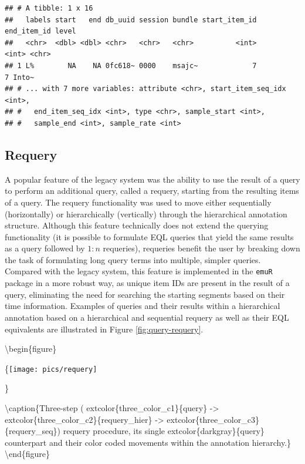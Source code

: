 \documentclass[]{book}
\begin{document}
\begin{verbatim}
## # A tibble: 1 x 16
##   labels start   end db_uuid session bundle start_item_id end_item_id level
##   <chr>  <dbl> <dbl> <chr>   <chr>   <chr>          <int>       <int> <chr>
## 1 L%        NA    NA 0fc618~ 0000    msajc~             7           7 Into~
## # ... with 7 more variables: attribute <chr>, start_item_seq_idx <int>,
## #   end_item_seq_idx <int>, type <chr>, sample_start <int>,
## #   sample_end <int>, sample_rate <int>
\end{verbatim}

\hypertarget{subsec:requery}{%
\subsection{Requery}\label{subsec:requery}}

A popular feature of the legacy system was the ability to use the result of a query to perform an additional query, called a requery, starting from the resulting items of a query. The requery functionality was used to move either sequentially (horizontally) or hierarchically (vertically) through the hierarchical annotation structure. Although this feature technically does not extend the querying functionality (it is possible to formulate EQL queries that yield the same results as a query followed by \(1:n\) requeries), requeries benefit the user by breaking down the task of formulating long query terms into multiple, simpler queries. Compared with the legacy system, this feature is implemented in the \texttt{emuR} package in a more robust way, as unique item IDs are present in the result of a query, eliminating the need for searching the starting segments based on their time information. Examples of queries and their results within a hierarchical annotation based on a hierarchical and sequential requery as well as their EQL equivalents are illustrated in Figure \ref{fig:query-requery}.

\textbackslash{}begin\{figure\}

\{\centering \texttt{[image: pics/requery]}

\}

\textbackslash{}caption\{Three-step ( extcolor\{three\_color\_c1\}\{query\} -\textgreater{} extcolor\{three\_color\_c2\}\{requery\_hier\} -\textgreater{} extcolor\{three\_color\_c3\}\{requery\_seq\}) requery procedure, its single extcolor\{darkgray\}\{query\} counterpart and their color coded movements within the annotation hierarchy.\}\label{fig:query-requery}
\textbackslash{}end\{figure\}
\end{document}

